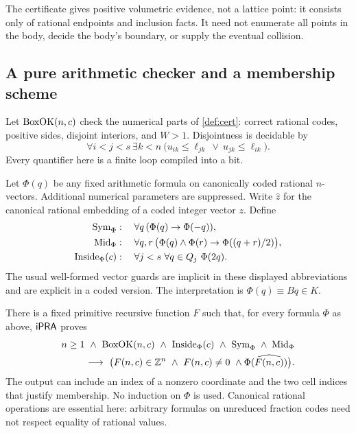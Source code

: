 The certificate gives positive volumetric evidence, not a lattice point:
it consists only of rational endpoints and inclusion facts.
It need not enumerate all points in the body, decide the body's
boundary, or supply the eventual collision.

\subsection{A pure arithmetic checker and a membership scheme}

Let \(\operatorname{BoxOK}(n,c)\) check the numerical parts of
\cref{def:cert}: correct rational codes, positive sides, disjoint
interiors, and \(W>1\). Disjointness is decidable by
\begin{equation}\label{eq:box-disjoint}
 \forall i<j<s\ \exists k<n\
 \bigl(u_{ik}\leq\ell_{jk}\ \vee\
       u_{jk}\leq\ell_{ik}\bigr).
\end{equation}
Every quantifier here is a finite loop compiled into a bit.

Let \(\Phi(q)\) be any fixed arithmetic formula on canonically coded rational
\(n\)-vectors. Additional numerical parameters are suppressed.
Write \(\widehat z\) for the canonical rational embedding of a coded
integer vector \(z\).
Define
\begin{align*}
 \operatorname{Sym}_\Phi&:\quad
   \forall q\,(\Phi(q)\to\Phi(-q)),\\
 \operatorname{Mid}_\Phi&:\quad
   \forall q,r\,\bigl(\Phi(q)\wedge\Phi(r)
       \to\Phi((q+r)/2)\bigr),\\
 \operatorname{Inside}_\Phi(c)&:\quad
   \forall j<s\ \forall q\in Q_j\ \Phi(2q).
\end{align*}
The usual well-formed vector guards are implicit in these displayed
abbreviations and are explicit in a coded version. The interpretation
is \(\Phi(q)\equiv Bq\in K\).

\begin{theorem}\label{thm:main}
There is a fixed primitive recursive function \(F\) such that, for every
formula \(\Phi\) as above, \(\mathsf{iPRA}\) proves
\[
\begin{split}
 n\geq1\ \wedge\ \operatorname{BoxOK}(n,c)\ \wedge\
 \operatorname{Inside}_\Phi(c)\ \wedge\ \operatorname{Sym}_\Phi\ \wedge\ \operatorname{Mid}_\Phi\\
 \longrightarrow\
 \bigl(F(n,c)\in\mathbb Z^n\ \wedge\ F(n,c)\neq0\
      \wedge\Phi(\widehat{F(n,c)})\bigr).
\end{split}
\]
The output can include an index of a nonzero coordinate and the two
cell indices that justify membership. No induction on \(\Phi\) is used.
Canonical rational operations are essential here: arbitrary formulas
on unreduced fraction codes need not respect equality of rational values.
\end{theorem}

